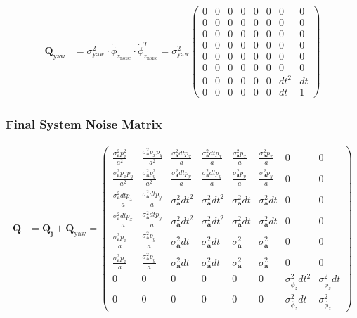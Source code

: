 \documentclass{article}
\begin{document}
\begin{align}
  \textbf{Q}_{\textrm{yaw}} &= \sigma^2_{\textrm{yaw}} \cdot \dot{\phi}_{z_\textrm{noise}} \cdot \dot{\phi}_{z_\textrm{noise}}^T
  = \sigma^2_{\textrm{yaw}} \left(\begin{matrix}0 & 0 & 0 & 0 & 0 & 0 & 0 & 0\\0 & 0 & 0 & 0 & 0 & 0 & 0 & 0\\0 & 0 & 0 & 0 & 0 & 0 & 0 & 0\\0 & 0 & 0 & 0 & 0 & 0 & 0 & 0\\0 & 0 & 0 & 0 & 0 & 0 & 0 & 0\\0 & 0 & 0 & 0 & 0 & 0 & 0 & 0\\0 & 0 & 0 & 0 & 0 & 0 & dt^{2} & dt\\0 & 0 & 0 & 0 & 0 & 0 & dt & 1\end{matrix}\right)
\end{align}

\subsubsection{Final System Noise Matrix}

\begin{align}
  \textbf{Q} &= \textbf{Q}_{\textbf{j}} + \textbf{Q}_{\textrm{yaw}}
  = \left(\begin{matrix}\frac{\sigma^2_\textbf{a} p_{x}^{2}}{a^{2}} & \frac{\sigma^2_\textbf{a} p_{x} p_{y}}{a^{2}} & \frac{\sigma^2_\textbf{a} dt p_{x}}{a} & \frac{\sigma^2_\textbf{a} dt p_{x}}{a} & \frac{\sigma^2_\textbf{a} p_{x}}{a} & \frac{\sigma^2_\textbf{a} p_{x}}{a} & 0 & 0\\\frac{\sigma^2_\textbf{a} p_{x} p_{y}}{a^{2}} & \frac{\sigma^2_\textbf{a} p_{y}^{2}}{a^{2}} & \frac{\sigma^2_\textbf{a} dt p_{y}}{a} & \frac{\sigma^2_\textbf{a} dt p_{y}}{a} & \frac{\sigma^2_\textbf{a} p_{y}}{a} & \frac{\sigma^2_\textbf{a} p_{y}}{a} & 0 & 0\\\frac{\sigma^2_\textbf{a} dt p_{x}}{a} & \frac{\sigma^2_\textbf{a} dt p_{y}}{a} & \sigma^2_\textbf{a} dt^{2} & \sigma^2_\textbf{a} dt^{2} & \sigma^2_\textbf{a} dt & \sigma^2_\textbf{a} dt & 0 & 0\\\frac{\sigma^2_\textbf{a} dt p_{x}}{a} & \frac{\sigma^2_\textbf{a} dt p_{y}}{a} & \sigma^2_\textbf{a} dt^{2} & \sigma^2_\textbf{a} dt^{2} & \sigma^2_\textbf{a} dt & \sigma^2_\textbf{a} dt & 0 & 0\\\frac{\sigma^2_\textbf{a} p_{x}}{a} & \frac{\sigma^2_\textbf{a} p_{y}}{a} & \sigma^2_\textbf{a} dt & \sigma^2_\textbf{a} dt & \sigma^2_\textbf{a} & \sigma^2_\textbf{a} & 0 & 0\\\frac{\sigma^2_\textbf{a} p_{x}}{a} & \frac{\sigma^2_\textbf{a} p_{y}}{a} & \sigma^2_\textbf{a} dt & \sigma^2_\textbf{a} dt & \sigma^2_\textbf{a} & \sigma^2_\textbf{a} & 0 & 0\\0 & 0 & 0 & 0 & 0 & 0 & \sigma_{\dot{\phi_z}}^2 dt^{2} & \sigma_{\dot{\phi_z}}^2 dt\\0 & 0 & 0 & 0 & 0 & 0 & \sigma_{\dot{\phi_z}}^2 dt & \sigma_{\dot{\phi_z}}^2\end{matrix}\right)
\end{align}
\clearpage
\end{document}
